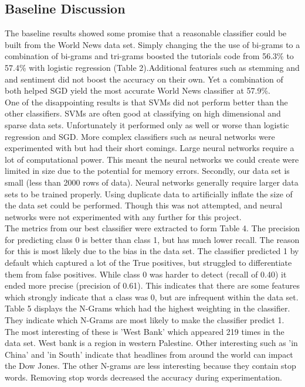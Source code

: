 \documentclass[11pt,a4paper]{article}
\begin{document}
\subsection{Baseline Discussion}
The baseline results showed some promise that a reasonable classifier could be built from the World News data set. Simply changing the the use of bi-grams to a combination of bi-grams and tri-grams boosted the tutorials code from 56.3\% to 57.4\% with logistic regression (Table 2).Additional features such as stemming and and sentiment did not boost the accuracy on their own. Yet a combination of both helped SGD yield the most accurate World News classifier at 57.9\%.\\

One of the disappointing results is that SVMs did not perform better than the other classifiers. SVMs are often good at classifying on high dimensional and sparse data sets. Unfortunately it performed only as well or worse than logistic regression and SGD. More complex classifiers such as neural networks were experimented with but had their short comings. Large neural networks require a lot of computational power. This meant the neural networks we could create were limited in size due to the potential for memory errors. Secondly, our data set is small (less than 2000 rows of data). Neural networks generally require larger data sets to be trained properly. Using duplicate data to artificially inflate the size of the data set could be performed. Though this was not attempted, and neural networks were not experimented with any further for this project.\\

The metrics from our best classifier were extracted to form Table 4. The precision for predicting class 0 is better than class 1, but has much lower recall. The reason for this is most likely due to the bias in the data set. The classifier predicted 1 by default which captured a lot of the True positives, but struggled to differentiate them from false positives. While class 0 was harder to detect (recall of 0.40) it ended more precise (precision of 0.61). This indicates that there are some features which strongly indicate that a class was 0, but are infrequent within the data set.\\

Table 5 displays the N-Grams which had the highest weighting in the classifier. They indicate which N-Grams are most likely to make the classifier predict 1. The most interesting of these is 'West Bank' which appeared 219 times in the data set. West bank is a region in western Palestine. Other interesting such as 'in China' and 'in South' indicate that headlines from around the world can impact the Dow Jones. The other N-grams are less interesting because they contain stop words. Removing stop words decreased the accuracy during experimentation.\\
\end{document}
